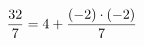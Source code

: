 \documentclass[preview]{standalone}
\begin{document}
\begin{align*}
\special{dvisvgm:raw <g id='unique000'>}\frac{32}{7} = 4 + \frac{(-2) \cdot (-2)}{7}\special{dvisvgm:raw </g>}
\end{align*}
\end{document}
